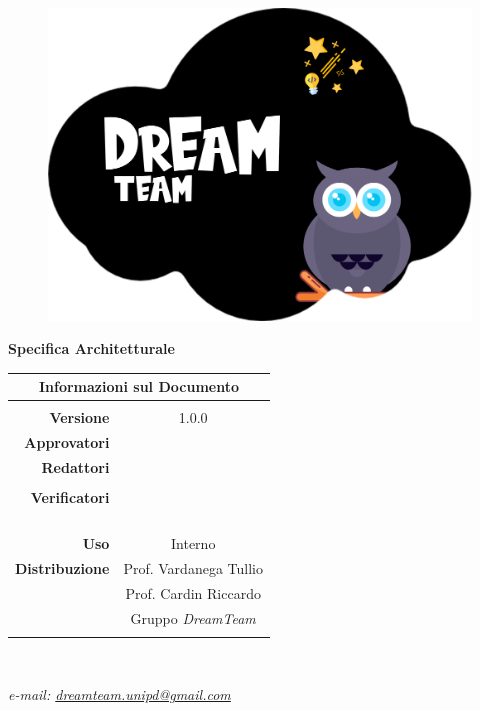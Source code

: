 
\begin{center}

\begin{figure}
\centering
\includegraphics[scale=0.05]{Contenuto/Immagini/DreamTeam.png} 
\end{figure}

{\Huge{\textbf{Specifica Architetturale}}} \\ [1cm]
\begin{table}[htbp]
\centering
\begin{tabular}{r|c}
\multicolumn{2}{c}{\textbf{Informazioni sul Documento}} \\
\hline \\
\textbf{Versione} & 1.0.0 \\ \rule{0pt}{3ex}    
\textbf{Approvatori} &  \\ \rule{0pt}{3ex}      
\textbf{Redattori} & \FP{} \\ \rule{0pt}{2ex}   
& \GC{} \\ \rule{0pt}{3ex}    
\textbf{Verificatori} & \MG{} \\ \rule{0pt}{2ex}   
&  \\ \rule{0pt}{2ex}   
&  \\ \rule{0pt}{2ex}
&  \\ \rule{0pt}{2ex} 
&  \\ \rule{0pt}{3ex}        
\textbf{Uso} & Interno \\ \rule{0pt}{3ex}    
\textbf{Distribuzione} & Prof. Vardanega Tullio \\ \rule{0pt}{2ex}   
& Prof. Cardin Riccardo \\ \rule{0pt}{2ex}   
& Gruppo \textit{DreamTeam} \\ \rule{0pt}{0.1cm}   
\end{tabular} \\ [0.5cm]
\end{table}

\textsl{ e-mail: \href{mailto:dreamteam.unipd@gmail.com}{dreamteam.unipd@gmail.com} } \\[2cm]
\end{center}
\pagebreak